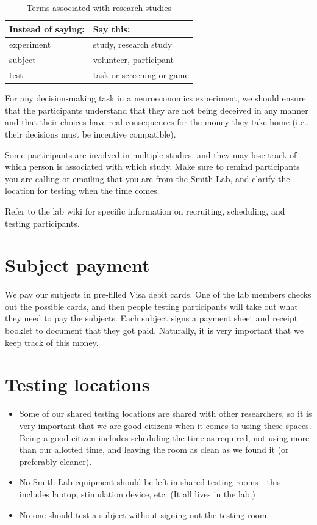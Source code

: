 \documentclass[letterpaper,12pt,oneside]{memoir}
\begin{document}
\begin{table}
\centering
\caption{Terms associated with research studies}
\begin{tabular}{ll}
\toprule
Instead of saying: & Say this:\\
\midrule
experiment& study, research study\\
subject& volunteer, participant\\
test & task or screening or game \\
\bottomrule
\end{tabular}
\end{table}

For any decision-making task in a neuroeconomics experiment, we should ensure that the participants understand that they are not being deceived in any manner and that their choices have real consequences for the money they take home (i.e., their decisions must be incentive compatible). 

Some participants are involved in multiple studies, and they may lose track of which person is associated with which study. Make sure to remind participants you are calling or emailing that you are from the Smith Lab, and clarify the location for testing when the time comes.

Refer to the lab wiki for specific information on recruiting, scheduling, and testing participants.


\section{Subject payment}
\label{sec:subject_payment}

We pay our subjects in pre-filled Visa debit cards. One of the lab members checks out the possible cards, and then people testing participants will take out what they need to pay the subjects. Each subject signs a payment sheet and receipt booklet to document that they got paid. Naturally, it is very important that we keep track of this money.



\section{Testing locations}
\label{sec:testing_locations}

\begin{itemize}
\item Some of our shared testing locations are shared with other researchers, so it is very important that we are good citizens when it comes to using these spaces. Being a good citizen includes scheduling the time as required, not using more than our allotted time, and leaving the room as clean as we found it (or preferably cleaner).

\item No Smith Lab equipment should be left in shared testing rooms---this includes laptop, stimulation device, etc. (It all lives in the lab.)

\item No one should test a subject without signing out the testing room.
\end{itemize}
\end{document}
